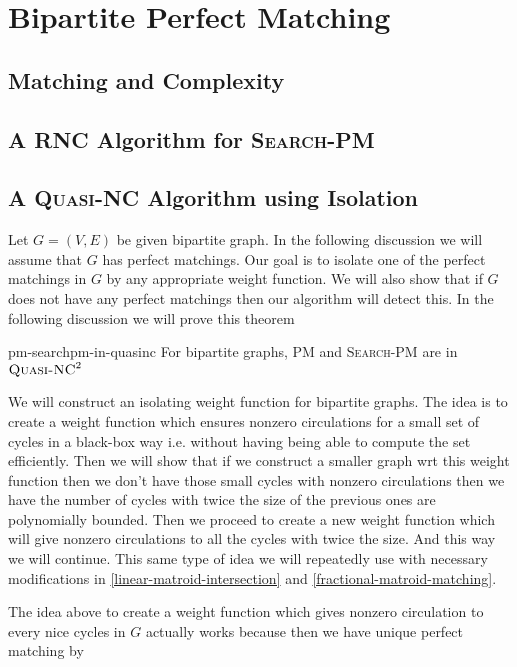 \chapter{Bipartite Perfect Matching}
\section{Matching and Complexity}
\section{A \textsc{RNC} Algorithm for \textsc{Search-PM}}\label{rnc-bipartite-pm}
\section{A \textsc{Quasi-NC} Algorithm using Isolation}
Let $G=(V,E)$ be given bipartite graph. In the following discussion we will assume that $G$ has perfect matchings. Our goal is to isolate one of the perfect matchings in $G$ by any appropriate weight function. We will also show that if $G$ does not have any perfect matchings then our algorithm will detect this. In the following discussion we will prove this theorem
\begin{Theorem}{\cite[Theorem 3.1]{FennerGurjarThierauf_2016_Bpm_CONF}}{pm-searchpm-in-quasinc}
	For bipartite graphs, \textsc{PM} and \textsc{Search-PM} are in $\textsc{Quasi-NC}^2$
\end{Theorem}

We will construct an isolating weight function for bipartite graphs. The idea is to create a weight function which ensures nonzero circulations for a small set of cycles in a black-box way i.e. without having being able to compute the set efficiently. Then we will show that if we construct a smaller graph wrt this weight function then we don't have those small cycles with nonzero circulations then we have the number of cycles with twice the size of the previous ones are polynomially bounded. Then we proceed to create a new weight function which will give nonzero circulations to all the cycles with twice the size. And this way we will continue. This same type of idea we will repeatedly use with necessary modifications in \autoref{linear-matroid-intersection} and \autoref{fractional-matroid-matching}.

The idea above to create a weight function which gives nonzero circulation to every nice cycles in $G$ actually works because  then we have unique perfect matching by 
